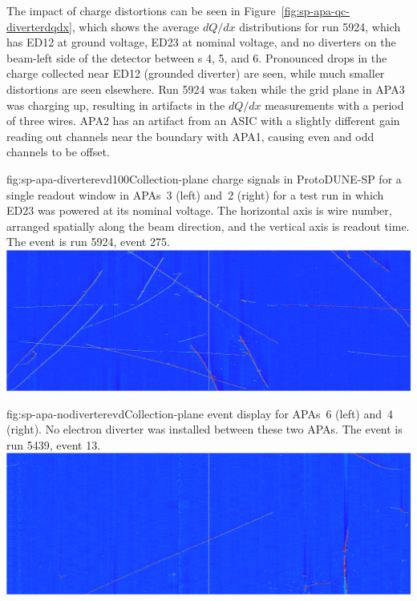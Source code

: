 The impact of charge distortions can be seen in Figure~\ref{fig:sp-apa-qc-diverterdqdx}, which shows the average $dQ/dx$ distributions for  run 5924, which has ED12 at ground voltage, ED23 at nominal voltage, and no diverters on the beam-left side of the detector between s 4, 5, and 6.  Pronounced drops in the charge collected near ED12 (grounded diverter) are seen, while much smaller distortions are seen elsewhere.  Run 5924 was taken while the grid plane in APA3 was charging up, resulting in artifacts in the $dQ/dx$ measurements with a period of three wires.  APA2 has an artifact from an ASIC with a slightly different gain reading out channels near the boundary with APA1, causing even and odd channels to be offset.

\begin{dunefigure}{fig:sp-apa-diverterevd100}{Collection-plane charge signals in ProtoDUNE-SP for a single readout window in APAs~3 (left) and~2 (right) for a test run in which ED23 was powered at its nominal voltage.  The horizontal axis is wire number, arranged spatially along the beam direction, and the vertical axis is readout time.  The event is run 5924, event 275.}
    \includegraphics[width=\textwidth,trim=85mm 0mm 85mm 0mm,clip]{graphics/sp-apa-diverter100percent-R5924-E275-T1T5.png}
\end{dunefigure}

\begin{dunefigure}{fig:sp-apa-nodiverterevd}{Collection-plane event display for APAs~6 (left) and~4 (right). No electron diverter was installed between these two APAs.  The event is run 5439, event 13.}
    \includegraphics[width=\textwidth,trim=85mm 0mm 85mm 0mm,clip]{graphics/sp-apa-nodiverterevd.png}
\end{dunefigure}

